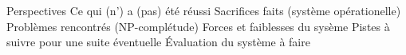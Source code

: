\begin{frame}{Perspectives}
Ce qui (n') a (pas) été réussi
Sacrifices faits (système opérationelle)
Problèmes rencontrés (NP-complétude)
Forces et faiblesses du sysème
Pistes à suivre pour une suite éventuelle
Évaluation du système à faire
\end{frame}